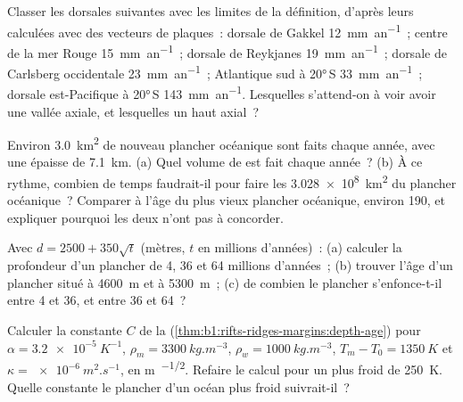 \begin{exercise}[$\star$]\label{exo:b1:rifts-ridges-margins:3}
Classer les dorsales suivantes avec les limites de la définition, d'après leurs  calculées avec des vecteurs de plaques~: dorsale de Gakkel
\qty{12}{mm.an^{-1}}~; centre de la mer Rouge \qty{15}{mm.an^{-1}}~; dorsale de Reykjanes
\qty{19}{mm.an^{-1}}~; dorsale de Carlsberg occidentale \qty{23}{mm.an^{-1}}~; Atlantique
sud à \ang{20}\,S \qty{33}{mm.an^{-1}}~; dorsale est-Pacifique à
\ang{20}\,S \qty{143}{mm.an^{-1}}. Lesquelles s'attend-on à voir avoir une
vallée axiale, et lesquelles un haut axial~?
\end{exercise}

\begin{exercise}[$\star$]\label{exo:b1:rifts-ridges-margins:4}
Environ \qty{3.0}{km^2} de nouveau plancher océanique sont faits chaque année, avec une 
épaisse de \qty{7.1}{km}. (a) Quel volume de  est fait chaque année~? (b) À ce
rythme, combien de temps faudrait-il pour faire les \qty{3.028e8}{km^2} du plancher
océanique~? Comparer à l'âge du plus vieux plancher océanique, environ
\qty{190}{\Ma}, et expliquer pourquoi les deux n'ont pas à concorder.
\end{exercise}

\begin{exercise}[$\star\star$]\label{exo:b1:rifts-ridges-margins:5}
Avec $d = 2500 + 350\sqrt t$ (mètres, $t$ en millions d'années)~: (a) calculer
la profondeur d'un plancher de 4, 36 et 64 millions d'années~; (b) trouver l'âge d'un plancher
situé à \qty{4600}{m} et à \qty{5300}{m}~; (c) de combien le plancher
s'enfonce-t-il entre 4 et \qty{36}{\Ma}, et entre 36 et \qty{64}{\Ma}~?
\end{exercise}

\begin{exercise}[$\star\star$]\label{exo:b1:rifts-ridges-margins:6}
Calculer la constante $C$ de la 
(\cref{thm:b1:rifts-ridges-margins:depth-age}) pour $\alpha =
\qty{3.2e-5}{K^{-1}}$, $\rho_m = \qty{3300}{kg.m^{-3}}$, $\rho_w =
\qty{1000}{kg.m^{-3}}$, $T_m - T_0 = \qty{1350}{K}$ et $\kappa =
\qty{e-6}{m^2.s^{-1}}$, en \unit{m.\Ma^{-1/2}}. Refaire le calcul pour un 
plus froid de \qty{250}{K}. Quelle constante le plancher d'un océan plus froid suivrait-il~?
\end{exercise}

